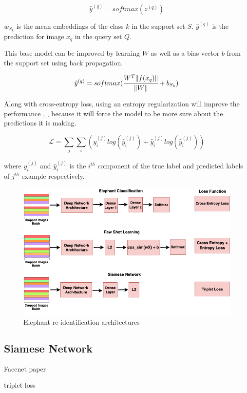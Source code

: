 \documentclass[10pt,twocolumn,letterpaper]{article}
\begin{document}
$$
\hat{y}^{(q)} = softmax(z^{(q)})
$$

$w_{S_k}$ is the mean embeddings of the class $k$ in the support set $S$. $\hat{y}^{(q)}$ is the prediction for image $x_q$ in the query set $Q$.

This base model can be improved by learning $W$ as well as a bias vector $b$ from the support set using back propagation. 

$$
\hat{y}^{(q)} = softmax(\cfrac{W^T \lVert f(x_q) \rVert}{\lVert W \rVert} + b_{S_k})
$$

Along with cross-entropy loss, using an entropy regularization will improve the performance \cite{fewshotlectures}, \cite{fewshotbaseline}, \cite{fewshotmetabaseline} because it will force the model to be more sure about the predictions it is making.

$$
\mathcal{L} = \sum_{j}\sum_{i} (y_i^{(j)} log(\hat{y}_i^{(j)}) + \hat{y}_i^{(j)} log({\hat{y}_i^{(j)}}))
$$

where $y_i^{(j)}$ and $\hat{y}_i^{(j)}$ is the $i^{th}$ component of the true label and predicted labels of $j^{th}$ example respectively.


\begin{figure}[t]
  \centering
  \includegraphics[scale=0.275]{reidentification_network}
   \caption{Elephant re-identification architectures}
   \label{fig:reidentification_network}
\end{figure}

\subsection{Siamese Network}

Facenet paper

triplet loss
\end{document}
